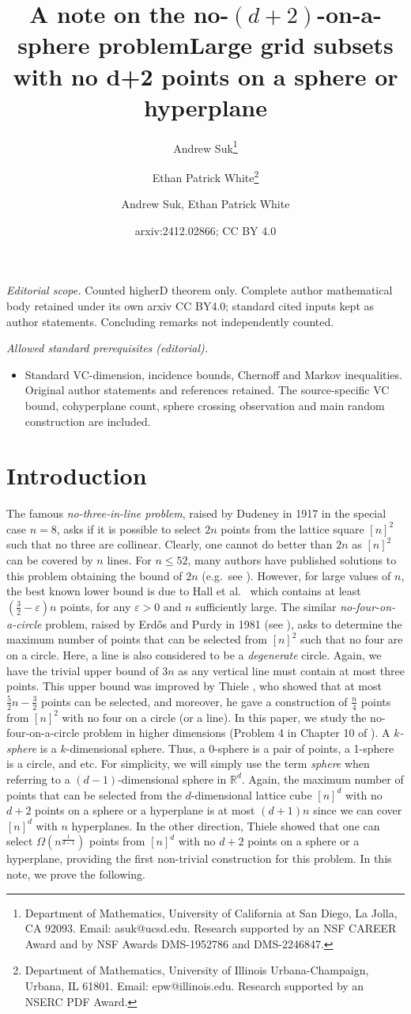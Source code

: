 \documentclass[11pt]{article}
\date{}
\title{A note on the no-$(d+2)$-on-a-sphere problem}
\author{Andrew Suk\thanks{Department of Mathematics, University of California at San Diego, La Jolla, CA 92093. Email: asuk@ucsd.edu. Research supported by an NSF
CAREER Award and by NSF Awards DMS-1952786 and DMS-2246847.} \and 
Ethan Patrick White\thanks{Department of Mathematics, University of Illinois Urbana-Champaign, Urbana, IL 61801. Email: epw@illinois.edu. Research supported by an NSERC PDF Award.}}
\date{}
\title{Large grid subsets with no d+2 points on a sphere or hyperplane}
\author{Andrew Suk, Ethan Patrick White}
\date{arxiv:2412.02866; CC BY 4.0}
\theoremstyle{plain}
\theoremstyle{definition}
\theoremstyle{remark}
\begin{document}
\maketitle
\noindent\textit{Editorial scope.} Counted higherD theorem only. Complete author mathematical body retained under its own arxiv CC BY4.0; standard cited inputs kept as author statements. Concluding remarks not independently counted.\par\medskip
\noindent\textit{Allowed standard prerequisites (editorial).}\begin{itemize}
\item Standard VC-dimension, incidence bounds, Chernoff and Markov inequalities. Original author statements and references retained. The source-specific VC bound, cohyperplane count, sphere crossing observation and main random construction are included.
\end{itemize}\medskip
\section{Introduction}
%
%
The famous \emph{no-three-in-line problem}, raised by Dudeney in 1917 in the special case $n = 8$, asks if it is possible to select $2n$ points from the lattice square $[n]^2$ such that no three are collinear.  Clearly, one cannot do better than $2n$ as $[n]^2$ can be covered by $n$ lines.  For $n\leq 52$, many authors have published solutions to this problem obtaining the bound of $2n$ (e.g.~see \cite{Fl}).  However, for large values of $n$, the best known lower bound is due to Hall et al.~\cite{Ha} which contains at least $\left(\frac{3}{2} - \varepsilon\right)n$ points, for any $\varepsilon > 0$ and $n$ sufficiently large.
%
The similar \emph{no-four-on-a-circle} problem, raised by Erd\H os and Purdy in 1981 (see \cite{RKG}), asks to determine the maximum number of points that can be selected from $[n]^2$ such that no four are on a circle.  Here, a line is also considered to be a \emph{degenerate} circle.  Again, we have the trivial upper bound of $3n$ as any vertical line must contain at most three points.  This upper bound was improved by Thiele \cite{thiele1}, who showed that at most $\frac{5}{2}n - \frac{3}{2}$ points can be selected, and moreover, he gave a construction of $\frac{n}{4}$ points from $[n]^2$ with no four on a circle (or  a line).  
%
%
In this paper, we study the no-four-on-a-circle problem in higher dimensions (Problem 4 in Chapter 10 of \cite{brass}).  A \emph{$k$-sphere} is a $k$-dimensional sphere.  Thus, a 0-sphere is a pair of points, a 1-sphere is a circle, and etc.  For simplicity, we will simply use the term \emph{sphere} when referring to a $(d-1)$-dimensional sphere in $\mathbb{R}^d$.  Again, the maximum number of points that can be selected from the $d$-dimensional lattice cube $[n]^d$ with no $d+2$ points on a sphere or a hyperplane is at most $(d+1)n$ since we can cover $[n]^d$ with $n$ hyperplanes.  In the other direction, Thiele \cite{thiele2} showed that one can select $\Omega(n^{\frac{1}{d-1}})$ points from $[n]^d$ with no $d+2$ points on a sphere or a hyperplane, providing the first non-trivial construction for this problem.  In this note, we prove the following.
%
%
%
%
%
%
%
\end{document}
